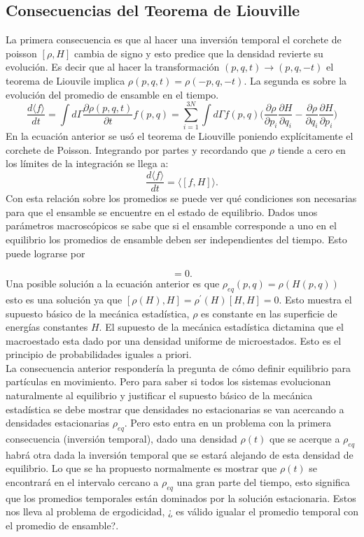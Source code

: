 \subsection{Consecuencias del Teorema de Liouville}
La primera consecuencia es que al hacer una inversión temporal el corchete de poisson $[\rho, H]$ cambia de signo y esto predice que la densidad revierte su evolución. Es decir que al hacer la transformación $(p,q,t) \to (p,q,-t)$ el teorema de Liouvile implica $\rho(p,q,t)=\rho(-p,q,-t)$.
La segunda es sobre la evolución del promedio de ensamble en el tiempo.
\begin{equation}
\frac{d \langle f \rangle}{dt}= \int d \Gamma \frac{\partial \rho(p,q,t)}{\partial t} f(p,q)= \sum_{i=1}^{3N} \int d\Gamma f(p,q) \Big( \frac{\partial \rho}{\partial p_{i}}\frac{\partial H}{\partial q_{i}} - \frac{\partial \rho}{\partial q_{i}}\frac{\partial H}{\partial p_{i}}  \Big)
\end{equation}
En la ecuación anterior se usó el teorema de Liouville poniendo explícitamente el corchete de Poisson. Integrando por partes y recordando que $\rho$ tiende a cero en los límites de la integración se llega a:
\begin{equation}
\frac{d \langle f \rangle}{dt}= \langle [f,H] \rangle.
\end{equation}
Con esta relación sobre los promedios se puede ver qué condiciones son necesarias para que el ensamble se encuentre en el estado de equilibrio. Dados unos parámetros macroscópicos se sabe que si el ensamble corresponde a uno en el equilibrio los promedios de ensamble deben ser independientes del tiempo. Esto puede lograrse por
 
\begin{equation}
[\rho_{eq}, H]=0.
\end{equation}
Una posible solución a la ecuación anterior es que $\rho_{eq}(p,q)=\rho(H(p,q))$ esto es una solución ya que $[\rho(H),H]=\rho^{'}(H)[H,H]=0$. Esto muestra el supuesto básico de la mecánica estadística, $\rho$ es constante en las superficie de energías constantes $H$. El supuesto de la mecánica estadística dictamina que el macroestado esta dado por una densidad uniforme de microestados. Esto es el principio de probabilidades iguales  a priori.
\\
La consecuencia anterior respondería la pregunta de cómo definir equilibrio para partículas en movimiento. Pero para saber si todos los sistemas evolucionan naturalmente al equilibrio  y justificar el supuesto básico de la mecánica estadística se debe mostrar que densidades no estacionarias se van acercando a densidades estacionarias $\rho_{eq}$. Pero esto entra en un problema con la primera consecuencia (inversión temporal), dado una densidad $\rho(t)$ que se acerque a $\rho_{eq}$ habrá otra dada la inversión temporal que se estará alejando de esta densidad de equilibrio. Lo que se ha propuesto normalmente es mostrar que $\rho(t)$ se encontrará en el intervalo cercano a $\rho_{eq}$ una gran parte del tiempo, esto significa que los promedios temporales están dominados por la solución estacionaria. Estos nos lleva al problema de ergodicidad, ¿ es válido igualar el promedio temporal con el promedio de ensamble?. 
\\

